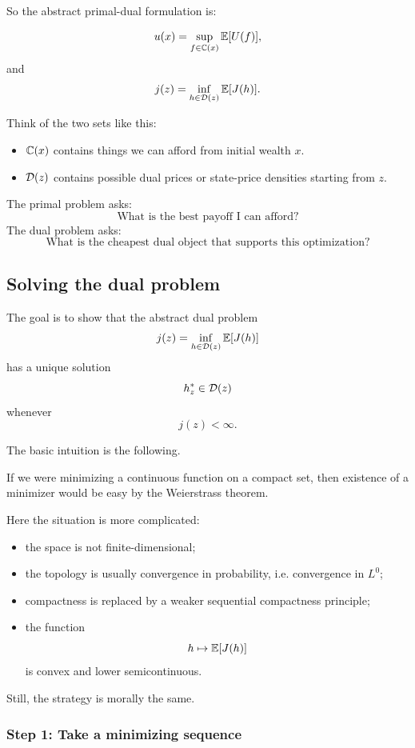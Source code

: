 So the abstract primal-dual formulation is:

\[
    u(x)
    =
    \sup_{f\in\mathbb{C}(x)}
    \mathbb{E}[U(f)],
\]
and
\[
    j(z)
    =
    \inf_{h\in\mathcal{D}(z)}
    \mathbb{E}[J(h)].
\]

\begin{primer}
Think of the two sets like this:
\begin{itemize}
    \item $\mathbb{C}(x)$ contains things we can afford from initial wealth $x$.
    \item $\mathcal{D}(z)$ contains possible dual prices or state-price densities starting from $z$.
\end{itemize}

The primal problem asks:
\[
    \text{What is the best payoff I can afford?}
\]
The dual problem asks:
\[
    \text{What is the cheapest dual object that supports this optimization?}
\]
\end{primer}

\subsection{Solving the dual problem}

The goal is to show that the abstract dual problem
\[
    j(z)
    =
    \inf_{h\in\mathcal{D}(z)}
    \mathbb{E}[J(h)]
\]
has a unique solution
\[
    h_z^*\in\mathcal{D}(z)
\]
whenever
\[
    j(z)<\infty.
\]

The basic intuition is the following.

If we were minimizing a continuous function on a compact set, then existence of a minimizer would be easy by the Weierstrass theorem.

Here the situation is more complicated:
\begin{itemize}
    \item the space is not finite-dimensional;
    \item the topology is usually convergence in probability, i.e. convergence in $L^0$;
    \item compactness is replaced by a weaker sequential compactness principle;
    \item the function
    \[
        h\mapsto \mathbb{E}[J(h)]
    \]
    is convex and lower semicontinuous.
\end{itemize}

Still, the strategy is morally the same.

\subsubsection*{Step 1: Take a minimizing sequence}

